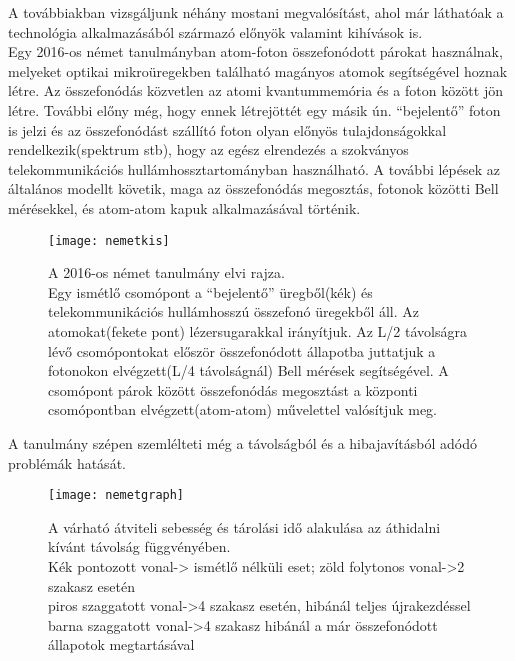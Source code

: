 A továbbiakban vizsgáljunk néhány mostani megvalósítást, ahol már láthatóak a technológia alkalmazásából származó előnyök valamint kihívások is.\\
Egy 2016-os német tanulmányban\cite{uphoff2016integrated} atom-foton összefonódott párokat használnak, melyeket optikai mikroüregekben található magányos atomok segítségével hoznak létre. Az összefonódás közvetlen az atomi kvantummemória és a foton között jön létre. További előny még, hogy ennek létrejöttét egy másik ún. “bejelentő” foton is jelzi és az összefonódást szállító foton olyan előnyös tulajdonságokkal rendelkezik(spektrum stb), hogy az egész elrendezés a szokványos telekommunikációs hullámhossztartományban használható. A további lépések az általános modellt követik, maga az összefonódás megosztás, fotonok közötti Bell mérésekkel, és atom-atom kapuk alkalmazásával történik.
\begin{figure}[H]
\centering
\texttt{[image: nemetkis]}
\caption[Atom-foton ismétló elvi rajza]{A 2016-os német tanulmány elvi rajza.\\
Egy ismétlő csomópont a “bejelentő” üregből(kék) és telekommunikációs hullámhosszú összefonó üregekből áll. Az atomokat(fekete pont) lézersugarakkal irányítjuk. Az L/2 távolságra lévő csomópontokat először összefonódott állapotba juttatjuk a fotonokon elvégzett(L/4 távolságnál) Bell mérések segítségével. A csomópont párok között összefonódás megosztást a központi csomópontban elvégzett(atom-atom) művelettel valósítjuk meg.   
}
\end{figure}
A tanulmány szépen szemlélteti még a távolságból és a hibajavításból adódó problémák hatását.
\begin{figure}[H]
\centering
\texttt{[image: nemetgraph]}
\caption[Ismétlő teljesítmény]{A várható átviteli sebesség és tárolási idő alakulása az áthidalni kívánt távolság függvényében.\\
Kék pontozott vonal-> ismétlő nélküli eset; zöld folytonos vonal->2 szakasz esetén\\
piros szaggatott vonal->4 szakasz esetén, hibánál teljes újrakezdéssel\\
barna szaggatott vonal->4 szakasz hibánál a már összefonódott állapotok megtartásával\\
}
\end{figure}


